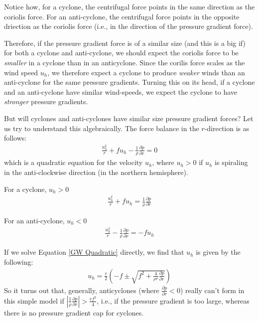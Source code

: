 Notice how, for a cyclone, the centrifugal force points in the same direction as the coriolis force. For an anti-cyclone, the centrifugal force points in the opposite driection as the coriolis force (i.e., in the direction of the pressure gradient force).

Therefore, if the pressure gradient force is of a similar size (and this is a big if) for both a cyclone and anti-cyclone, we should expect the coriolis force to be \textit{smaller} in a cyclone than in an anticyclone. Since the corilis force scales as the wind speed \(u_h\), we therefore expect a cyclone to produce \textit{weaker} winds than an anti-cyclone for the same pressure gradients. Turning this on its head, if a cyclone and an anti-cyclone have similar wind-speeds, we expect the cyclone to have \textit{stronger} pressure gradients.

But will cyclones and anti-cyclones have similar size pressure gradient forces? Let us try to understand this algebraically. The force balance in the \(r\)-direction is as follows:
\begin{align}
    \label{GW Quadratic}
    \boxed{
        \frac{u_h^2}{r}+fu_h-\frac{1}{\rho}\frac{\partial p}{\partial r}=0
    }
\end{align}
which is a quadratic equation for the velocity \(u_h\), where \(u_h>0\) if \(u_h\) is spiraling in the anti-clockwise direction (in the northern hemisphere). \vspace{2mm}

\begin{minipage}{.48\linewidth}
    \centering
    For a cyclone, \(u_h>0\)
    \begin{align*}
        \frac{u_h^2}{r}+fu_h = \frac{1}{\rho}\frac{\partial p}{\partial r}
    \end{align*}
\end{minipage}
\hfill
\begin{minipage}{.48\linewidth}
    \centering
    For an anti-cyclone, \(u_h<0\)
    \begin{align*}
        \frac{u_h^2}{r} - \frac{1}{\rho}\frac{\partial p}{\partial r} = -fu_h
    \end{align*}
\end{minipage}

\vspace{2mm}
If we solve Equation \ref{GW Quadratic} directly, we find that \(u_h\) is given by the following:
\begin{align*}
    u_h = \frac{r}{2} \left( 
        -f \pm \sqrt{f^2 + \frac{4}{\rho r}\frac{\partial p}{\partial r}}
     \right)
\end{align*}
So it turns out that, generally, anticyclones (where \(\frac{\partial p}{\partial r}<0\)) really can't form in this simple model if \(\left|\frac{1}{\rho}\frac{\partial p}{\partial r}\right|>\frac{rf^2}{4}\), i.e., if the pressure gradient is too large, whereas there is no pressure gradient cap for cyclones.

